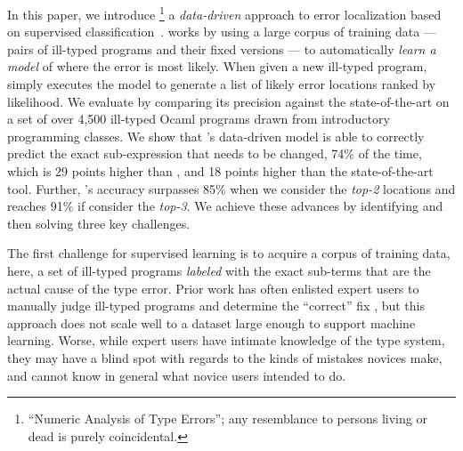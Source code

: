 %
In this paper, we introduce \toolname
\footnote{``Numeric Analysis of Type Errors''; any resemblance to persons living or dead is purely coincidental.}
a \emph{data-driven} approach to error
localization based on supervised
classification~\citep{Kotsiantis2007-pj}.
%
\toolname works by using a large corpus
of training data --- pairs of ill-typed
programs and their fixed versions ---
to automatically \emph{learn a model}
of where the error is most likely.
%
When given a new ill-typed program,
\toolname simply executes the model
to generate a list of likely error
locations ranked by likelihood.
%
We evaluate \toolname by comparing its
precision against the state-of-the-art
on a set of over 4,500 ill-typed Ocaml
programs drawn from introductory
programming classes.
%
We show that \toolname's data-driven
model is able to correctly predict
the exact sub-expression that needs to
be changed, 74\% of the time, which is
29 points higher than \ocaml, and
18 points higher than the state-of-the-art
\sherrloc tool.
%
Further, \toolname's accuracy surpasses
85\% when we consider the \emph{top-2}
locations and reaches 91\% if consider
the \emph{top-3}.
%
We achieve these advances by identifying
and then solving three key challenges.

%
The first challenge for supervised learning
is to acquire a corpus of training data, here,
a set of ill-typed programs \emph{labeled}
with the exact sub-terms that are the actual
cause of the type error.
%
Prior work has often enlisted expert users
to manually judge ill-typed programs and
determine the ``correct'' fix \citep[\eg][]{Loncaric2016-uk},
but this approach does not scale well to
a dataset large enough to support machine
learning.
%
Worse, while expert users have intimate
knowledge of the type system, they may
have a blind spot with regards to the
kinds of mistakes novices make, and
cannot know in general what novice users
intended to do.

